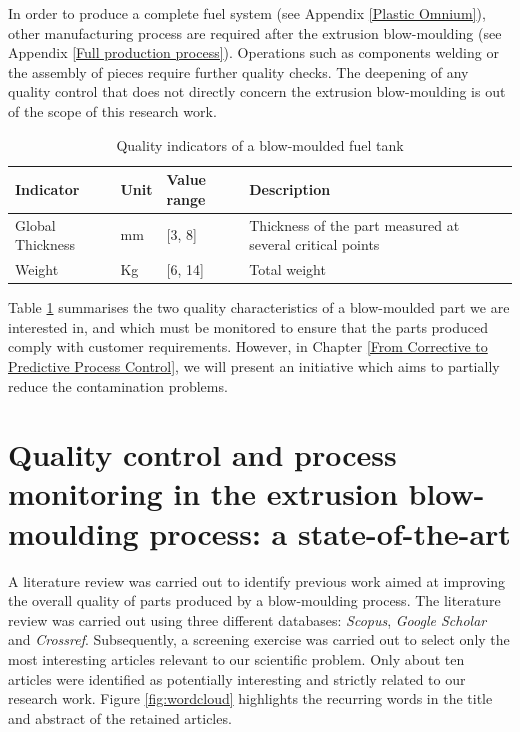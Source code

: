In order to produce a complete fuel system (see Appendix \ref{Plastic Omnium}), other manufacturing process are required after the extrusion blow-moulding (see Appendix \ref{Full production process}). Operations such as components welding or the assembly of pieces require further quality checks. The deepening of any quality control that does not directly concern the extrusion blow-moulding is out of the scope of this research work.  
%
\begin{table}[]
\caption{Quality indicators of a blow-moulded fuel tank }
\label{tab:quality_inidcators}
\begin{tabular}{@{}lllp{6cm}@{}}
\toprule
\textbf{Indicator} & \textbf{Unit} & \textbf{Value range} & \textbf{Description}                                                 \\ 
\midrule
Global Thickness           & mm                        & {[}3, 8{]}           & Thickness of the part measured at several critical points \\ 
Weight & Kg & {[}6, 14{]} & Total weight \\ 
\bottomrule
\end{tabular}
\end{table}
%
Table \ref{tab:quality_inidcators} summarises the two quality characteristics of a blow-moulded part we are interested in, and which must be monitored to ensure that the parts produced comply with customer requirements. However, in Chapter \ref{From Corrective to Predictive Process Control}, we will present an initiative which aims to partially reduce the contamination problems.

\section{Quality control and process monitoring in the extrusion blow-moulding process: a state-of-the-art} \label{state-of-the-art}

A literature review was carried out to identify previous work aimed at improving the overall quality of parts produced by a blow-moulding process. The literature review was carried out using three different databases: \textit{Scopus}, \textit{Google Scholar} and \textit{Crossref}. Subsequently, a screening exercise was carried out to select only the most interesting articles relevant to our scientific problem. Only about ten articles were identified as potentially interesting and strictly related to our research work. Figure \ref{fig:wordcloud} highlights the recurring words in the title and abstract of the retained articles. 

